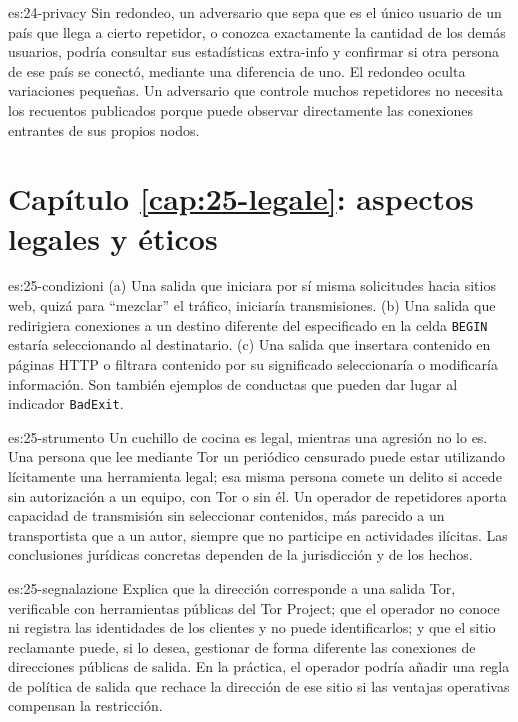 \begin{soluzione}{es:24-privacy}
Sin redondeo, un adversario que sepa que es el único usuario de un país que llega a cierto repetidor, o conozca exactamente la cantidad de los demás usuarios, podría consultar sus estadísticas extra-info y confirmar si otra persona de ese país se conectó, mediante una diferencia de uno. El redondeo oculta variaciones pequeñas. Un adversario que controle muchos repetidores no necesita los recuentos publicados porque puede observar directamente las conexiones entrantes de sus propios nodos.
\end{soluzione}

\section*{Capítulo \ref{cap:25-legale}: aspectos legales y éticos}

\begin{soluzione}{es:25-condizioni}
(a) Una salida que iniciara por sí misma solicitudes hacia sitios web, quizá para \enquote{mezclar} el tráfico, iniciaría transmisiones. (b) Una salida que redirigiera conexiones a un destino diferente del especificado en la celda \texttt{BEGIN} estaría seleccionando al destinatario. (c) Una salida que insertara contenido en páginas HTTP o filtrara contenido por su significado seleccionaría o modificaría información. Son también ejemplos de conductas que pueden dar lugar al indicador \texttt{BadExit}.
\end{soluzione}

\begin{soluzione}{es:25-strumento}
Un cuchillo de cocina es legal, mientras una agresión no lo es. Una persona que lee mediante Tor un periódico censurado puede estar utilizando lícitamente una herramienta legal; esa misma persona comete un delito si accede sin autorización a un equipo, con Tor o sin él. Un operador de repetidores aporta capacidad de transmisión sin seleccionar contenidos, más parecido a un transportista que a un autor, siempre que no participe en actividades ilícitas. Las conclusiones jurídicas concretas dependen de la jurisdicción y de los hechos.
\end{soluzione}

\begin{soluzione}{es:25-segnalazione}
Explica que la dirección corresponde a una salida Tor, verificable con herramientas públicas del Tor Project; que el operador no conoce ni registra las identidades de los clientes y no puede identificarlos; y que el sitio reclamante puede, si lo desea, gestionar de forma diferente las conexiones de direcciones públicas de salida. En la práctica, el operador podría añadir una regla de política de salida que rechace la dirección de ese sitio si las ventajas operativas compensan la restricción.
\end{soluzione}


